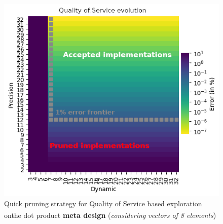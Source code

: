 \clearpage
            \begin{figure}[h!]
                \centering
                \includegraphics[width=1.0\textwidth]{Figures/results/quickPruning_annotated.png}
                \caption[Quick pruning of design space]{Quick pruning strategy for Quality of Service based exploration on\newline the dot product {\bf meta design}\textsuperscript{\styx} ({\it considering vectors of 8 elements})}
                \label{ch.expe:sec.strategies:ssec.qos:fig.quick}
            \end{figure}
        
